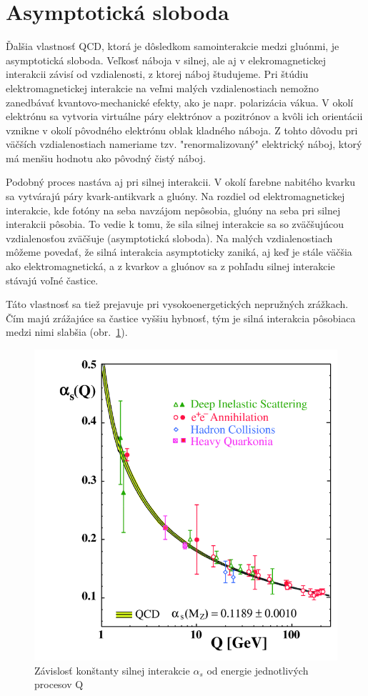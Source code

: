 \documentclass[thesismargins, thesislinespacing]{rnthesis}
\begin{document}
\section{Asymptotická sloboda}
Ďalšia vlastnosť QCD, ktorá je dôsledkom samointerakcie medzi gluónmi, je asymptotická sloboda. Veľkosť náboja v silnej, ale aj v elekromagnetickej interakcii závisí od vzdialenosti, z ktorej náboj študujeme. Pri štúdiu elektromagnetickej interakcie na veľmi malých vzdialenostiach nemožno zanedbávať kvantovo-mechanické efekty, ako je napr. polarizácia vákua. V okolí elektrónu sa vytvoria virtuálne páry elektrónov a pozitrónov a kvôli ich  orientácii vznikne v okolí pôvodného elektrónu oblak kladného náboja. Z tohto dôvodu pri väčších vzdialenostiach nameriame tzv. "renormalizovaný" \-e\-lektrický náboj, ktorý má menšiu hodnotu ako pôvodný čistý náboj.

Podobný proces nastáva aj pri silnej interakcii. V okolí farebne nabitého kvarku sa vytvárajú páry kvark-antikvark a gluóny. Na rozdiel od elektromagnetickej interakcie, kde fotóny na seba navzájom nepôsobia, gluóny na seba pri silnej interakcii pôsobia. To vedie k tomu, že sila silnej interakcie sa so zväčšujúcou vzdialenosťou zväčšuje (asymptotická sloboda). Na malých vzdialenostiach môžeme povedať, že silná interakcia asymptoticky zaniká, aj keď je stále väčšia ako elektromagnetická, a z kvarkov a gluónov sa z pohľadu silnej interakcie stávajú voľné častice. 

Táto vlastnosť sa tiež prejavuje pri vysokoenergetických nepružných zrážkach. Čím majú zrážajúce sa častice vyššiu hybnosť, tým je silná interakcia pôsobiaca medzi nimi slabšia (obr.~\ref{alfa}).
\begin{figure}
	\centering
	\includegraphics[scale=0.4]{./Obrazky_praca/zrazka.png}
	\caption{Závislosť konštanty silnej interakcie $\alpha_s$ od energie jednotlivých procesov Q \cite{3}}
	\label{alfa}
\end{figure}
\end{document}
